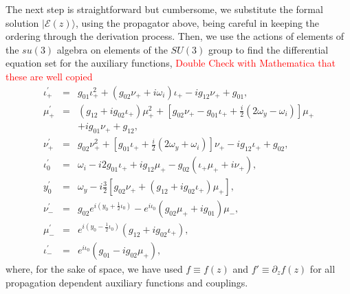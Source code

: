 \documentclass[9pt,twocolumn,twoside]{osajnl}
\begin{document}
The next step is straightforward but cumbersome, we substitute the formal solution $\vert \mathcal{E}(z) \rangle$, using the propagator above, being careful in keeping the ordering through the derivation process. 
Then, we use the actions of elements of the $su(3)$ algebra on elements of the $SU(3)$ group \cite{Nelson1967p857} to find the differential equation set for the auxiliary functions, \textcolor{red}{Double Check with Mathematica that these are well copied}
\begin{eqnarray}
	\iota_{+}^{\prime} &=&  g_{01} \iota_{+}^{2} +  \left( g_{02} \nu_{+} + i \omega_{i} \right) \iota_{+}  - i g_{12} \nu_{+} + g_{01}    ,    \label{eq:iota} \\
	\mu_{+}^{\prime} &=& \left(g_{12} + i g_{02} \iota_{+} \right)\mu_{+}^{2} + \left[ g_{02} \nu_{+} - g_{01} \iota_{+} + \frac{i}{2} \left(2\omega_{y} - \omega_{i} \right)\right] \mu_{+} \nonumber \\ && + i g_{01} \nu_{+} + g_{12}, \\
	\nu_{+}^{\prime} &=& g_{02} \nu_{+}^{2} +  \left[ g_{01} \iota_{+} + \frac{i}{2} \left( 2 \omega_{y} + \omega_{i}  \right) \right] \nu_{+}  - i g_{12} \iota_{+} + g_{02}  , \label{eq:mu} \\
	\iota_{0}^{\prime} &=& \omega_{i} - i 2  g_{01} \iota_{+} + i g_{12} \mu_{+} - g_{02} \left( \iota_{+} \mu_{+} + i \nu_{+} \right) , \\
	y_{0}^{\prime} &=& \omega_{y} - i\frac{3}{2}  
	[ g_{02}   \nu_{+} +    
	( g_{12} + i  g_{02} \iota_{+})\mu_{+}],  \\
	\nu_{-}^{\prime} &=& g_{02} e^{i  \left( y_0 + \frac{1}{2} \iota_0 \right)}
	 -  e^{i\iota_{0}}   \left( g_{02} \mu_{+} + i  g_{01} \right) \mu_{-} ,  \\
	\mu_{-}^{\prime} &=&  e^{i  \left( y_0 - \frac{1}{2} \iota_0 \right)}
	( g_{12} + i g_{02} \iota_{+}),\\
	\iota_{-}^{\prime} &=& e^{i \iota_{0}} \left( g_{01} - i g_{02}\mu_{+} \right), 
\end{eqnarray}
where, for the sake of space, we have used $f \equiv f(z)$ and $f' \equiv \partial_{z} f(z)$ for all propagation dependent auxiliary functions and couplings.
\end{document}
